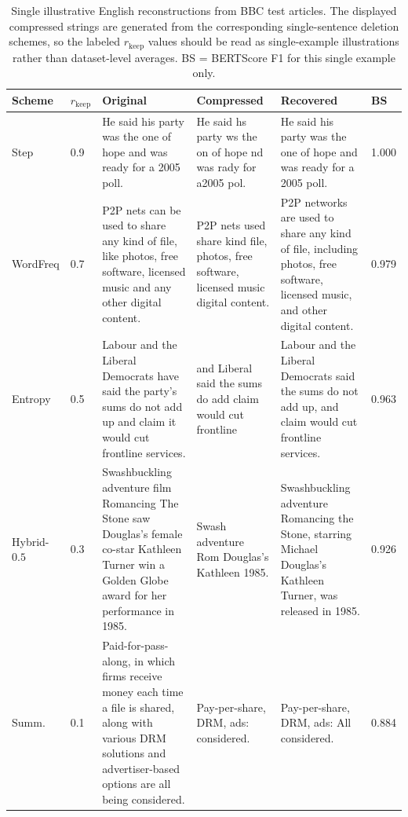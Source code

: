 \documentclass[11pt]{article}
\newcommand{\rkeep}{r_{\mathrm{keep}}}
\begin{document}
\begin{table}[tp]
\centering
\small
\caption{Single illustrative English reconstructions from BBC test articles. The displayed compressed strings are generated from the corresponding single-sentence deletion schemes, so the labeled $\rkeep$ values should be read as single-example illustrations rather than dataset-level averages. BS = BERTScore F1 for this single example only.}
\label{tab:examples}
\begin{tabular}{p{1.5cm}p{0.9cm}p{2.7cm}p{2.5cm}p{2.7cm}p{0.85cm}}
\toprule
\textbf{Scheme} & $\rkeep$ & \textbf{Original} & \textbf{Compressed} & \textbf{Recovered} & \textbf{BS} \\
\midrule
Step & 0.9 & He said his party was the one of hope and was ready for a 2005 poll. &
He said hs party ws the on of hope nd was rady for a2005 pol. &
He said his party was the one of hope and was ready for a 2005 poll. & 1.000 \\
\midrule
WordFreq & 0.7 & P2P nets can be used to share any kind of file, like photos, free software, licensed music and any other digital content. &
P2P nets used share kind file, photos, free software, licensed music digital content. &
P2P networks are used to share any kind of file, including photos, free software, licensed music, and other digital content. & 0.979 \\
\midrule
Entropy & 0.5 & Labour and the Liberal Democrats have said the party's sums do not add up and claim it would cut frontline services. &
and Liberal said the sums do add claim would cut frontline &
Labour and the Liberal Democrats said the sums do not add up, and claim would cut frontline services. & 0.963 \\
\midrule
Hybrid-$0.5$ & 0.3 & Swashbuckling adventure film Romancing The Stone saw Douglas's female co-star Kathleen Turner win a Golden Globe award for her performance in 1985. &
Swash adventure Rom Douglas's Kathleen 1985. &
Swashbuckling adventure Romancing the Stone, starring Michael Douglas's Kathleen Turner, was released in 1985. & 0.926 \\
\midrule
Summ. & 0.1 & Paid-for-pass-along, in which firms receive money each time a file is shared, along with various DRM solutions and advertiser-based options are all being considered. &
Pay-per-share, DRM, ads: considered. &
Pay-per-share, DRM, ads: All considered. & 0.884 \\
\bottomrule
\end{tabular}
\end{table}
\end{document}
